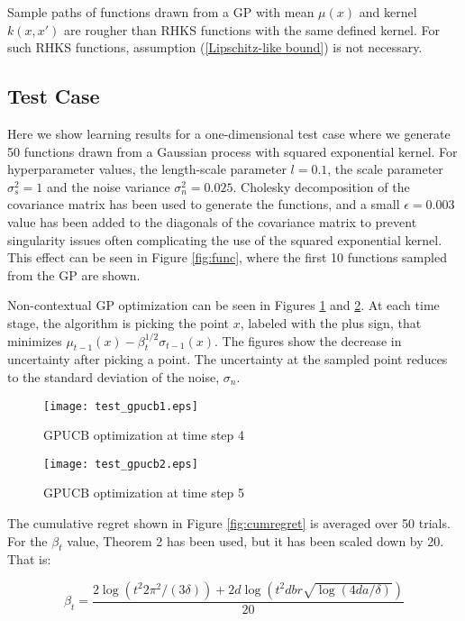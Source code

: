 Sample paths of functions drawn from a GP with mean $\mu(x)$ and kernel $k(x,x')$ are rougher than RHKS functions with the same defined kernel. For such RHKS functions, assumption (\ref{Lipschitz-like bound}) is not necessary.

\subsection*{Test Case}

Here we show learning results for a one-dimensional test case where we generate 50 functions drawn from a Gaussian process with squared exponential kernel. For hyperparameter values, the length-scale parameter $l = 0.1$, the scale parameter $\sigma_{s}^{2} = 1$ and the noise variance $\sigma_{n}^{2} = 0.025$. Cholesky decomposition of the covariance matrix has been used to generate the functions, and a small $\epsilon = 0.003$ value has been added to the diagonals of the covariance matrix to prevent singularity issues often complicating the use of the squared exponential kernel. This effect can be seen in Figure \ref{fig:func}, where the first 10 functions sampled from the GP are shown. 

Non-contextual GP optimization can be seen in Figures \ref{fig:gpucb1} and \ref{fig:gpucb2}. At each time stage, the algorithm is picking the point $x$, labeled with the plus sign, that minimizes $\mu_{t-1}(x) - \beta_{t}^{1/2}\sigma_{t-1}(x)$. The figures show the decrease in uncertainty after picking a point. The uncertainty at the sampled point reduces to the standard deviation of the noise, $\sigma_{n}$.

\begin{figure}
\center
\texttt{[image: test\_gpucb1.eps]}			
\caption{GPUCB optimization at time step 4}
\label{fig:gpucb1}
\end{figure}

\begin{figure}
\center
\texttt{[image: test\_gpucb2.eps]}			
\caption{GPUCB optimization at time step 5}
\label{fig:gpucb2}
\end{figure}

The cumulative regret shown in Figure \ref{fig:cumregret} is averaged over 50 trials. For the $\beta_{t}$ value, Theorem 2 has been used, but it has been scaled down by 20. That is:

\begin{equation}
\beta_{t} = \frac{2 \log(t^{2}2 \pi^{2}/(3\delta)) + 2d\log(t^{2}dbr\sqrt{\log(4da/\delta)})}{20} \label{Thm2KrauseBeta}
\end{equation}


